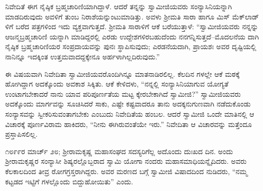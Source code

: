 ನಿವೇದಿತೆ ಈಗ ನೈಷ್ಠಿಕ ಬ್ರಹ್ಮಚಾರಿಣಿಯಾಗಿದ್ದಾಳೆ. ಆದರೆ ತನ್ನನ್ನು ಸ್ವಾಮೀಜಿಯವರು ಸಂನ್ಯಾಸಿನಿಯನ್ನಾಗಿ ಮಾಡದಿರುವುದು ಅವಳಿಗೆ ತುಂಬ ನಿರಾಶೆಯನ್ನುಂಟುಮಾಡಿತ್ತು. ಅವಳು ಶ್ರೀಮತಿ ಸಾರಾ ಹಾಗೂ ಮಿಸ್ ಮೆಕ್​ಲಾಡ್​ಳಿಗೆ ಬರೆದ ಪತ್ರಗಳಿಂದ ಇದು ವ್ಯಕ್ತವಾಗುತ್ತದೆ. ಶ್ರೀಮತಿ ಸಾರಾಳಿಗೆ ಆಕೆ ಬರೆಯುತ್ತಾಳೆ: “ಸ್ವಾಮೀಜಿಯವರು ನನ್ನನ್ನು ಆಜನ್ಮಬ್ರಹ್ಮಚಾರಿಣಿ ಯನ್ನಾಗಿ ಮಾಡಿದ್ದರಲ್ಲಿ ಎರಡು ಉದ್ದೇಶಗಳಿರಬಹುದೆಂದು ನನಗನ್ನಿಸುತ್ತದೆ–ಮೊದಲನೆಯ ದಾಗಿ ನೈಷ್ಠಿಕ ಬ್ರಹ್ಮಚಾರಿಣಿಯರ ಸಂಪ್ರದಾಯವನ್ನು ಪುನಃ ಸ್ಥಾಪಿಸುವುದು; ಎರಡನೆಯದಾಗಿ, ಪ್ರಾಯಶಃ ಅವರ ದೃಷ್ಟಿಯಲ್ಲಿ ನಾನಿನ್ನೂ ಇದಕ್ಕಿಂತ ಉತ್ತಮವಾದದ್ದಕ್ಕೇನೂ ಅರ್ಹಳಾಗಿಲ್ಲದಿರುವುದು.”

ಈ ವಿಷಯವಾಗಿ ನಿವೇದಿತಾ ಸ್ವಾಮೀಜಿಯವರೊಂದಿಗಿನ್ನೂ ಮಾತನಾಡಿರಲಿಲ್ಲ. ಕೆಲದಿನ ಗಳಲ್ಲೇ ಆಕೆ ಮಠಕ್ಕೆ ಹೋಗಿದ್ದಾಗ ಅದಕ್ಕೊಂದು ಅವಕಾಶ ಸಿಕ್ಕಿತು. ಆಕೆ ಕೇಳಿದಳು, “ನನ್ನಲ್ಲಿ ಸಂನ್ಯಾಸಿನಿಯಾಗುವ ಯೋಗ್ಯತೆ ಉಂಟಾಗಬೇಕಾದರೆ ನಾನು ಯಾವ ಪರಿಪೂರ್ಣತೆಯ ಮಟ್ಟ ಕ್ಕೇರಬೇಕಾಗಿದೆ ಸ್ವಾಮೀಜಿ?” ಸ್ವಾಮೀಜಿಯವರು ಅದಕ್ಕೊಂದು ಮಾರ್ಗವನ್ನು ಸೂಚಿಸಿದರೆ ಸಾಕು, ಎಷ್ಟೇ ಕಷ್ಟವಾದರೂ ತಾನು ಅದಕ್ಕನುಗುಣವಾಗಿ ನಡೆದುಕೊಂಡು ಸಂನ್ಯಾಸವನ್ನು ಸ್ವೀಕರಿಸುವಂತಾಗಬೇಕು ಎಂಬುದು ನಿವೇದಿತೆಯ ಹಂಬಲ. ಆದರೆ ಸ್ವಾಮೀಜಿ ಒಂದೇ ಮಾತಿನಲ್ಲಿ ಆ ವಿಚಾರಕ್ಕೆ ಪೂರ್ಣವಿರಾಮ ಹಾಕಿದರು, “ನೀನು ಈಗಿರುವಂತೆಯೇ ಇರು.” ನಿವೇದಿತಾ ಆ ವಿಚಾರವನ್ನು ಮತ್ತೆಂದೂ ಪ್ರಸ್ತಾಪಿಸಲಿಲ್ಲ.

೧೮೯೯ರ ಮಾರ್ಚ್ ೨೮; ಶ್ರೀರಾಮಕೃಷ್ಣ ಮಹಾಸಂಘದ ಸದಸ್ಯರಿಗೆಲ್ಲ ಅದೊಂದು ದುಃಖದ ದಿನ. ಅಂದು ಶ್ರೀರಾಮಕೃಷ್ಣರ ಸಂನ್ಯಾಸೀ ಶಿಷ್ಯರಲ್ಲೊಬ್ಬರಾದ ಸ್ವಾಮಿ ಯೋಗಾ ನಂದರು ಮಹಾಸಮಾಧಿಯನ್ನೈದಿದರು. ಅವರು ಕೆಲಕಾಲದಿಂದ ತೀವ್ರ ರೋಗಗ್ರಸ್ತರಾಗಿದ್ದರು. ಅವರ ಮರಣದ ಬಗ್ಗೆ ಸ್ವಾಮೀಜಿ ವಿಷಾದದಿಂದ ನುಡಿದರು, “ನಮ್ಮ ಕಟ್ಟಡದ ಇಟ್ಟಿಗೆ ಗಳಲ್ಲೊಂದು ಬಿದ್ದುಹೋಯಿತು” ಎಂದು.

